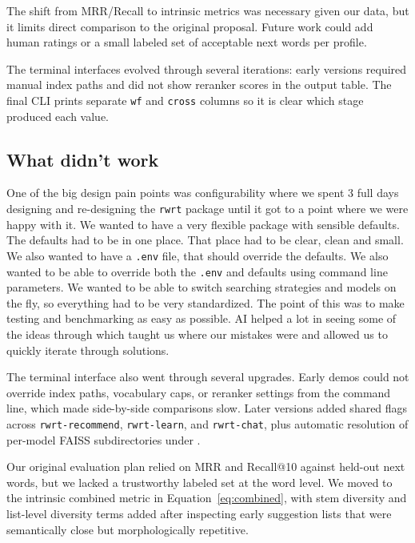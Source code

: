 \documentclass{article}
\begin{document}
The shift from MRR/Recall to intrinsic metrics was necessary given our data, but it limits direct comparison to the original proposal. Future work could add human ratings or a small labeled set of acceptable next words per profile.

The terminal interfaces evolved through several iterations: early versions required manual index paths and did not show reranker scores in the output table. The final CLI prints separate \texttt{wf} and \texttt{cross} columns so it is clear which stage produced each value.

\subsection{What didn't work}

One of the big design pain points was configurability where we spent 3 full days designing and re-designing the \texttt{rwrt} package until it got to a point where we were happy with it. We wanted to have a very flexible package with sensible defaults. The defaults had to be in one place. That place had to be clear, clean and small. We also wanted to have a \texttt{.env} file, that should override the defaults. We also wanted to be able to override both the \texttt{.env} and defaults using command line parameters. We wanted to be able to switch searching strategies and models on the fly, so everything had to be very standardized. The point of this was to make testing and benchmarking as easy as possible. AI helped a lot in seeing some of the ideas through which taught us where our mistakes were and allowed us to quickly iterate through solutions.

The terminal interface also went through several upgrades. Early demos could not override index paths, vocabulary caps, or reranker settings from the command line, which made side-by-side comparisons slow. Later versions added shared flags across \texttt{rwrt-recommend}, \texttt{rwrt-learn}, and \texttt{rwrt-chat}, plus automatic resolution of per-model FAISS subdirectories under .

Our original evaluation plan relied on MRR and Recall@10 against held-out next words, but we lacked a trustworthy labeled set at the word level. We moved to the intrinsic combined metric in Equation~\eqref{eq:combined}, with stem diversity and list-level diversity terms added after inspecting early suggestion lists that were semantically close but morphologically repetitive.
\end{document}
